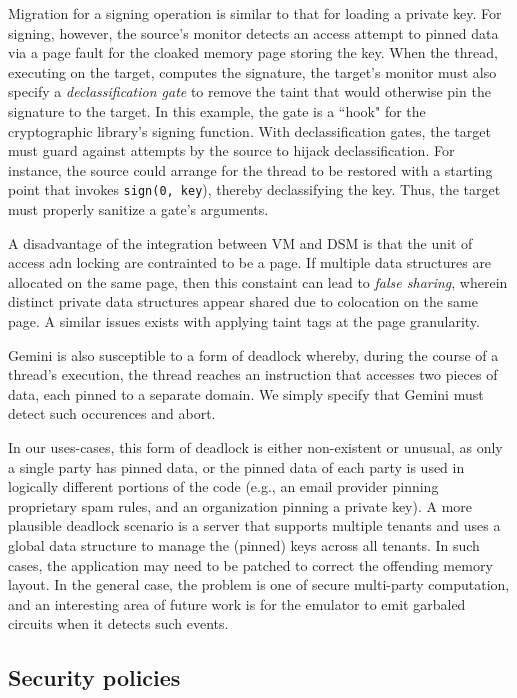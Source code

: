 %
Migration for a signing operation is similar to that for loading a
private key.
%
For signing, however, the source's monitor detects an 
access attempt to pinned data via a page fault for the cloaked memory page
storing the key.
%
When the thread, executing on the target, computes the signature, the target's
monitor must also specify a \emph{declassification gate} to remove the taint that
would otherwise pin the signature to the target.
%
In this example, the gate is a ``hook"  for the cryptographic library's
signing function.
%
With declassification gates, the target must guard against attempts by the source to
hijack declassification.
%
For instance, the source could arrange for the thread to be restored with a
starting point that invokes \texttt{sign(0, key}), thereby declassifying the key.
%
Thus, the target must properly sanitize a gate's arguments.


%
A disadvantage of the integration between VM and DSM is that the unit of access
adn locking are contrainted to be a page.
%
If multiple data structures are allocated on the same page, then this constaint
can lead to \emph{false sharing}, wherein distinct private data structures
appear shared due to colocation on the same page.
%
A similar issues exists with applying taint tags at the page granularity.


Gemini is also susceptible to a form of deadlock whereby, during the course of
a thread's execution, the thread reaches an instruction that accesses two
pieces of data, each pinned to a separate domain.
%
We simply specify that Gemini must detect such occurences and abort.


In our uses-cases, this form of deadlock is either non-existent or unusual, as
only a single party has pinned data, or the pinned data of each party is used 
in logically different portions of the code (e.g., an email provider pinning
proprietary spam rules, and an organization pinning a private key).
%
A more plausible deadlock scenario is a server that supports multiple tenants
and uses a global data structure to manage the (pinned) keys across all
tenants.
%
In such cases, the application may need to be patched to correct the offending
memory layout.
%
In the general case, the problem is one of secure multi-party computation, and
an interesting area of future work is for the emulator to emit garbaled
circuits when it detects such events.


\subsection{Security policies}

